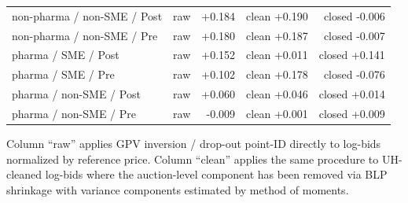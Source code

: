 \begin{table}[htbp]
\begin{threeparttable}
\begin{tabular}{llllrrr}
\multicolumn{3}{l}{non-pharma / non-SME / Post} & raw & +0.184 & clean +0.190 & closed -0.006 \\
\multicolumn{3}{l}{non-pharma / non-SME / Pre} & raw & +0.180 & clean +0.187 & closed -0.007 \\
\multicolumn{3}{l}{pharma / SME / Post} & raw & +0.152 & clean +0.011 & closed +0.141 \\
\multicolumn{3}{l}{pharma / SME / Pre} & raw & +0.102 & clean +0.178 & closed -0.076 \\
\multicolumn{3}{l}{pharma / non-SME / Post} & raw & +0.060 & clean +0.046 & closed +0.014 \\
\multicolumn{3}{l}{pharma / non-SME / Pre} & raw & -0.009 & clean +0.001 & closed +0.009 \\
\bottomrule
\end{tabular}
\begin{tablenotes}\footnotesize
\item Column ``raw'' applies GPV inversion / drop-out point-ID
directly to log-bids normalized by reference price. Column
``clean'' applies the same procedure to UH-cleaned log-bids where
the auction-level component has been removed via BLP shrinkage
with variance components estimated by method of moments.
\end{tablenotes}
\end{threeparttable}
\end{table}
